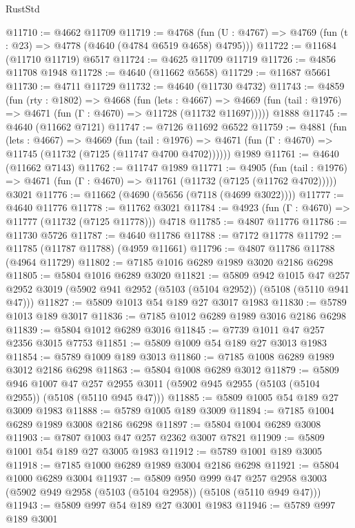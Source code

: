 \begin{lexlean}{RustStd}
\begin{coremodule}
@11710 := @4662 @11709
@11719 := @4768
    (fun (U : @4767) => @4769 (fun (t : @23) => @4778 (@4640 (@4784 @6519 @4658) @4795)))
@11722 := @11684 (@11710 @11719) @6517
@11724 := @4625 @11709 @11719
@11726 := @4856 @11708 @1948
@11728 := @4640 (@11662 @5658)
@11729 := @11687 @5661
@11730 := @4711 @11729
@11732 := @4640 (@11730 @4732)
@11743 := @4859
    (fun (rty : @1802) =>
    @4668
      (fun (lets : @4667) =>
      @4669 (fun (tail : @1976) => @4671 (fun (Γ : @4670) => @11728 (@11732 @11697)))))
    @1888
@11745 := @4640 (@11662 @7121)
@11747 := @7126 @11692 @6522
@11759 := @4881
    (fun (lets : @4667) =>
    @4669
      (fun (tail : @1976) =>
      @4671 (fun (Γ : @4670) => @11745 (@11732 (@7125 (@11747 @4700 @4702))))))
    @1989
@11761 := @4640 (@11662 @7143)
@11762 := @11747 @1989
@11771 := @4905
    (fun (tail : @1976) => @4671 (fun (Γ : @4670) => @11761 (@11732 (@7125 (@11762 @4702)))))
    @3021
@11776 := @11662 (@4690 (@5656 (@7118 (@4699 @3022))))
@11777 := @4640 @11776
@11778 := @11762 @3021
@11784 := @4923 (fun (Γ : @4670) => @11777 (@11732 (@7125 @11778))) @4718
@11785 := @4807 @11776
@11786 := @11730 @5726
@11787 := @4640 @11786
@11788 := @7172 @11778
@11792 := @11785 (@11787 @11788) (@4959 @11661)
@11796 := @4807 @11786 @11788 (@4964 @11729)
@11802 := @7185 @1016 @6289 @1989 @3020 @2186 @6298
@11805 := @5804 @1016 @6289 @3020
@11821 := @5809
    @942
    @1015
    @47
    @257
    @2952
    @3019
    (@5902 @941 @2952 (@5103 (@5104 @2952)) (@5108 (@5110 @941 @47)))
@11827 := @5809 @1013 @54 @189 @27 @3017 @1983
@11830 := @5789 @1013 @189 @3017
@11836 := @7185 @1012 @6289 @1989 @3016 @2186 @6298
@11839 := @5804 @1012 @6289 @3016
@11845 := @7739 @1011 @47 @257 @2356 @3015 @7753
@11851 := @5809 @1009 @54 @189 @27 @3013 @1983
@11854 := @5789 @1009 @189 @3013
@11860 := @7185 @1008 @6289 @1989 @3012 @2186 @6298
@11863 := @5804 @1008 @6289 @3012
@11879 := @5809
    @946
    @1007
    @47
    @257
    @2955
    @3011
    (@5902 @945 @2955 (@5103 (@5104 @2955)) (@5108 (@5110 @945 @47)))
@11885 := @5809 @1005 @54 @189 @27 @3009 @1983
@11888 := @5789 @1005 @189 @3009
@11894 := @7185 @1004 @6289 @1989 @3008 @2186 @6298
@11897 := @5804 @1004 @6289 @3008
@11903 := @7807 @1003 @47 @257 @2362 @3007 @7821
@11909 := @5809 @1001 @54 @189 @27 @3005 @1983
@11912 := @5789 @1001 @189 @3005
@11918 := @7185 @1000 @6289 @1989 @3004 @2186 @6298
@11921 := @5804 @1000 @6289 @3004
@11937 := @5809
    @950
    @999
    @47
    @257
    @2958
    @3003
    (@5902 @949 @2958 (@5103 (@5104 @2958)) (@5108 (@5110 @949 @47)))
@11943 := @5809 @997 @54 @189 @27 @3001 @1983
@11946 := @5789 @997 @189 @3001

\end{coremodule}
\end{lexlean}

